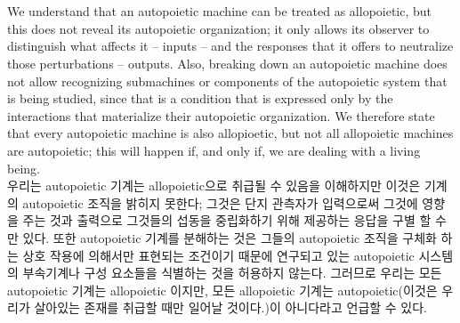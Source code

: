 \documentclass[11pt]{article} %
\begin{document}
\\
\\
We understand that an autopoietic machine can be treated as allopoietic, but this does not reveal its autopoietic organization; it only allows its observer to distinguish what affects it – inputs – and the responses that it offers to neutralize those perturbations – outputs. Also, breaking down an autopoietic machine does not allow recognizing submachines or components of the autopoietic system that is being studied, since that is a condition that is expressed only by the interactions that materialize their autopoietic organization. We therefore state that every autopoietic machine is also allopioetic, but not all allopoietic machines are autopoietic; this will happen if, and only if, we are dealing with a living being.
\\
우리는 autopoietic 기계는 allopoietic으로 취급될 수 있음을 이해하지만 이것은 기계의 autopoietic 조직을 밝히지 못한다; 그것은 단지 관측자가 입력으로써 그것에 영향을 주는 것과 출력으로 그것들의 섭동을 중립화하기 위해 제공하는 응답을 구별 할 수만 있다. 또한 autopoietic 기계를 분해하는 것은 그들의 autopoietic 조직을 구체화 하는 상호 작용에 의해서만 표현되는 조건이기 때문에 연구되고 있는 autopoietic 시스템의 부속기계나 구성 요소들을 식별하는 것을 허용하지 않는다. 그러므로 우리는 모든 autopoietic 기계는 allopoietic 이지만, 모든 allopoietic 기계는 autopoietic(이것은 우리가 살아있는 존재를 취급할 때만 일어날 것이다.)이 아니다라고 언급할 수 있다.


\end{document}
